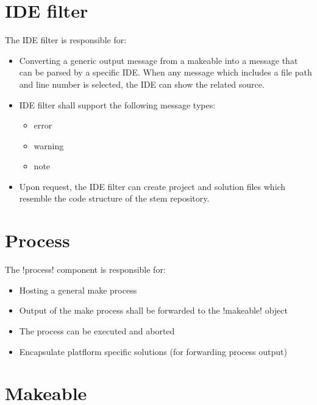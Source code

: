 \section{IDE filter}
\label{sec:share000.cppmake.ide_filter}

The IDE filter is responsible for:
\begin{itemize}
\item Converting a generic output message from a makeable into a message 
	  that can be parsed by a specific IDE. When any message which includes a
	  file path and line number is selected, the IDE can show the related source.
\item IDE filter shall support the following message types:
    \begin{itemize}
	\item error
    \item warning
    \item note
    \end{itemize}
\item Upon request, the IDE filter can create project and solution files which
    resemble the code structure of the stem repository.
\end{itemize}

\section{Process}
\label{sec:share000.cppmake.process}

The !process! component is responsible for:
\begin{itemize}
\item Hosting a general make process
\item Output of the make process shall be forwarded to the !makeable! object
\item The process can be executed and aborted
\item Encapsulate platflorm specific solutions (for forwarding process output)
\end{itemize}

\section{Makeable}
\label{sec:share000.cppmake.makeable}

